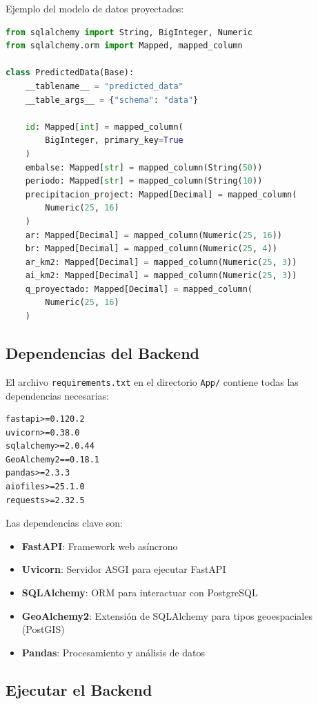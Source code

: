 Ejemplo del modelo de datos proyectados:

\begin{lstlisting}[language=python]
from sqlalchemy import String, BigInteger, Numeric
from sqlalchemy.orm import Mapped, mapped_column

class PredictedData(Base):
    __tablename__ = "predicted_data"
    __table_args__ = {"schema": "data"}

    id: Mapped[int] = mapped_column(
        BigInteger, primary_key=True
    )
    embalse: Mapped[str] = mapped_column(String(50))
    periodo: Mapped[str] = mapped_column(String(10))
    precipitacion_project: Mapped[Decimal] = mapped_column(
        Numeric(25, 16)
    )
    ar: Mapped[Decimal] = mapped_column(Numeric(25, 16))
    br: Mapped[Decimal] = mapped_column(Numeric(25, 4))
    ar_km2: Mapped[Decimal] = mapped_column(Numeric(25, 3))
    ai_km2: Mapped[Decimal] = mapped_column(Numeric(25, 3))
    q_proyectado: Mapped[Decimal] = mapped_column(
        Numeric(25, 16)
    )
\end{lstlisting}

\subsection{Dependencias del Backend}

El archivo \texttt{requirements.txt} en el directorio \texttt{App/} contiene todas las dependencias necesarias:

\begin{lstlisting}[style=bash]
fastapi>=0.120.2
uvicorn>=0.38.0
sqlalchemy>=2.0.44
GeoAlchemy2==0.18.1
pandas>=2.3.3
aiofiles>=25.1.0
requests>=2.32.5
\end{lstlisting}

Las dependencias clave son:
\begin{itemize}
    \item \textbf{FastAPI}: Framework web asíncrono
    \item \textbf{Uvicorn}: Servidor ASGI para ejecutar FastAPI
    \item \textbf{SQLAlchemy}: ORM para interactuar con PostgreSQL
    \item \textbf{GeoAlchemy2}: Extensión de SQLAlchemy para tipos geoespaciales (PostGIS)
    \item \textbf{Pandas}: Procesamiento y análisis de datos
\end{itemize}

\subsection{Ejecutar el Backend}

